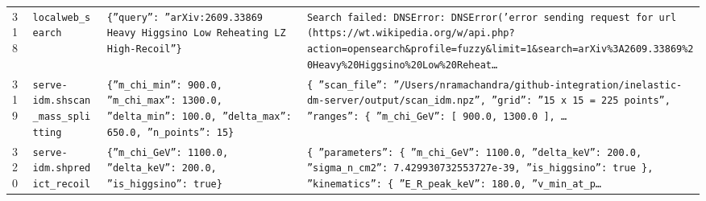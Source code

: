 \documentclass[11pt,a4paper]{article}
\begin{document}
\begin{longtable}{@{}p{}p{}p{}p{}@{}}
318 & \texttt{local}\newline\texttt{web\_\allowbreak{}search} & \texttt{\{''query'':\allowbreak{} ''arXiv:\allowbreak{}2609.33869 Heavy Higgsino Low Reheating LZ High-Recoil''\}\allowbreak{}} & \texttt{Search failed:\allowbreak{} DNSError:\allowbreak{} DNSError('error sending request for url (https:\allowbreak{}/\allowbreak{}/\allowbreak{}wt.wikipedia.org/\allowbreak{}w/\allowbreak{}api.php?action=\allowbreak{}opensearch\&profile=\allowbreak{}fuzzy\&limit=\allowbreak{}1\&search=\allowbreak{}arXiv\%3A2609.33869\%20Heavy\%20Higgsino\%20Low\%20Reheat\ldots{}\allowbreak{}} \\
319 & \texttt{serve-idm.sh}\newline\texttt{scan\_\allowbreak{}mass\_\allowbreak{}splitting} & \texttt{\{''m\_\allowbreak{}chi\_\allowbreak{}min'':\allowbreak{} 900.0,\allowbreak{} ''m\_\allowbreak{}chi\_\allowbreak{}max'':\allowbreak{} 1300.0,\allowbreak{} ''delta\_\allowbreak{}min'':\allowbreak{} 100.0,\allowbreak{} ''delta\_\allowbreak{}max'':\allowbreak{} 650.0,\allowbreak{} ''n\_\allowbreak{}points'':\allowbreak{} 15\}\allowbreak{}} & \texttt{\{   ''scan\_\allowbreak{}file'':\allowbreak{} ''/\allowbreak{}Users/\allowbreak{}nramachandra/\allowbreak{}github-integration/\allowbreak{}inelastic-dm-server/\allowbreak{}output/\allowbreak{}scan\_\allowbreak{}idm.npz'',\allowbreak{}   ''grid'':\allowbreak{} ''15 x 15 =\allowbreak{} 225 points'',\allowbreak{}   ''ranges'':\allowbreak{} \{     ''m\_\allowbreak{}chi\_\allowbreak{}GeV'':\allowbreak{} [       900.0,\allowbreak{}       1300.0     ]\allowbreak{},\allowbreak{}  \ldots{}\allowbreak{}} \\
320 & \texttt{serve-idm.sh}\newline\texttt{predict\_\allowbreak{}recoil} & \texttt{\{''m\_\allowbreak{}chi\_\allowbreak{}GeV'':\allowbreak{} 1100.0,\allowbreak{} ''delta\_\allowbreak{}keV'':\allowbreak{} 200.0,\allowbreak{} ''is\_\allowbreak{}higgsino'':\allowbreak{} true\}\allowbreak{}} & \texttt{\{   ''parameters'':\allowbreak{} \{     ''m\_\allowbreak{}chi\_\allowbreak{}GeV'':\allowbreak{} 1100.0,\allowbreak{}     ''delta\_\allowbreak{}keV'':\allowbreak{} 200.0,\allowbreak{}     ''sigma\_\allowbreak{}n\_\allowbreak{}cm2'':\allowbreak{} 7.429930732553727e-39,\allowbreak{}     ''is\_\allowbreak{}higgsino'':\allowbreak{} true   \}\allowbreak{},\allowbreak{}   ''kinematics'':\allowbreak{} \{     ''E\_\allowbreak{}R\_\allowbreak{}peak\_\allowbreak{}keV'':\allowbreak{} 180.0,\allowbreak{}     ''v\_\allowbreak{}min\_\allowbreak{}at\_\allowbreak{}p\ldots{}\allowbreak{}} \\

\end{longtable}
\end{document}

